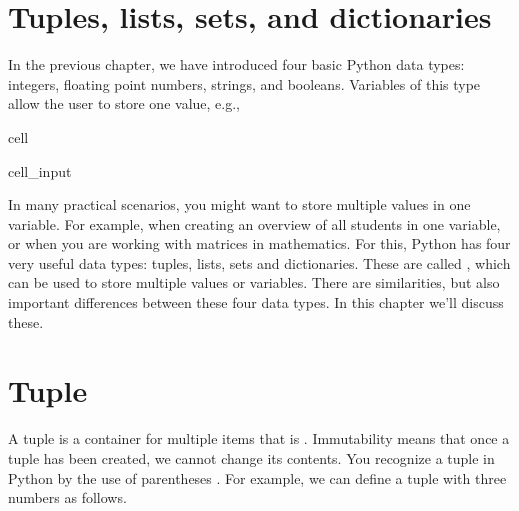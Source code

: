 \documentclass[letterpaper,10pt,english]{jupyterBook}
\begin{document}
\section{Tuples, lists, sets, and dictionaries}
\label{\detokenize{notebooks/02_Containers/02_Containers_student:tuples-lists-sets-and-dictionaries}}
\sphinxAtStartPar
In the previous chapter, we have introduced four basic Python data types: integers, floating point numbers, strings, and booleans. Variables of this type allow the user to store one value, e.g.,

\begin{sphinxuseclass}{cell}\begin{sphinxVerbatimInput}

\begin{sphinxuseclass}{cell_input}
\begin{sphinxVerbatim}[commandchars=\\\{\}]
  
  
\end{sphinxVerbatim}

\end{sphinxuseclass}\end{sphinxVerbatimInput}

\end{sphinxuseclass}
\sphinxAtStartPar
In many practical scenarios, you might want to store multiple values in one variable. For example, when creating an overview of all students in one variable, or when you are working with matrices in mathematics. For this, Python has four very useful data types: tuples, lists, sets and dictionaries. These are called , which can be used to store multiple values or variables. There are similarities, but also important differences between these four data types. In this chapter we’ll discuss these.


\section{Tuple}
\label{\detokenize{notebooks/02_Containers/02_Containers_student:tuple}}
\sphinxAtStartPar
A tuple is a container for multiple items that is . Immutability means that once a tuple has been created, we cannot change its contents. You recognize a tuple in Python by the use of parentheses \sphinxcode{\sphinxupquote{()}}. For example, we can define a tuple with three numbers as follows.
\end{document}
